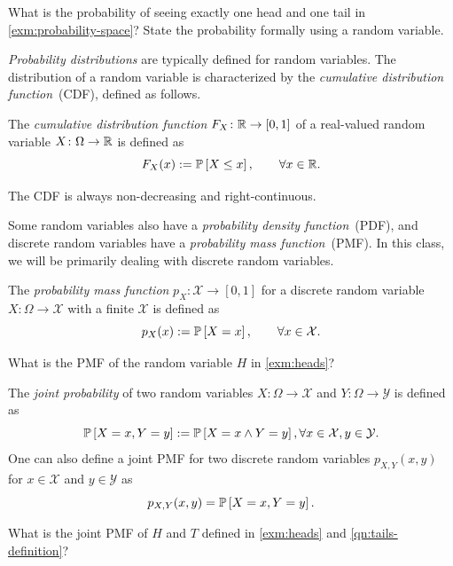 \documentclass[letterpaper,11pt]{article}
\begin{document}
\begin{question}
  What is the probability of seeing exactly one head and one tail in \cref{exm:probability-space}? State the probability formally using a random variable.
\end{question}

\emph{Probability distributions} are typically defined for random variables. The distribution of a random variable is characterized by the \emph{cumulative distribution function}~(CDF), defined as follows.
\begin{defn}[CDF]
  The \emph{cumulative distribution function} $F_{X}\colon \Real \to [0,1]$ of a real-valued random variable $X\colon \Omega \to \Real$ is defined as
  \[
   F_{X}(x) := \P{X \le x}, \qquad \forall x\in \Real. 
  \]
\end{defn}

The CDF is always non-decreasing and right-continuous.

Some random variables also have a \emph{probability density function}~(PDF), and discrete random variables have a \emph{probability mass function}~(PMF). In this class, we will be primarily dealing with discrete random variables.
\begin{defn}[PMF]
The \emph{probability mass function} $p_{X}\colon \mathcal{X} \to [0,1]$ for a discrete random variable $X\colon \Omega  \to  \mathcal{X}$ with a finite $\mathcal{X}$ is defined as
  \[
    p_{X}(x) := \P{X = x}, \qquad \forall x\in \mathcal{X} .
 \]
\end{defn}

\begin{question}
  What is the PMF of the random variable $H$ in \cref{exm:heads}?
\end{question}


\begin{defn} \label{def:joint-probability}
The \emph{joint probability} of two random variables $X\colon \Omega \to \mathcal{X}$ and $Y \colon \Omega \to \mathcal{Y}$ is defined as
\[
 \P{X = x, Y = y} := \P{X = x \wedge Y = y} , \forall  x\in \mathcal{X}, y\in \mathcal{Y}.
\]
One can also define a joint PMF for two discrete random variables $p_{X, Y}(x,y)$ for $x\in \mathcal{X}$ and $y\in \mathcal{Y}$ as
\[
 p_{X, Y}(x,y) = \P{X = x, Y = y}. 
\]
\end{defn}

\begin{question}
What is the joint PMF of $H$ and $T$ defined in \cref{exm:heads} and \cref{qn:tails-definition}?
\end{question}
\end{document}

